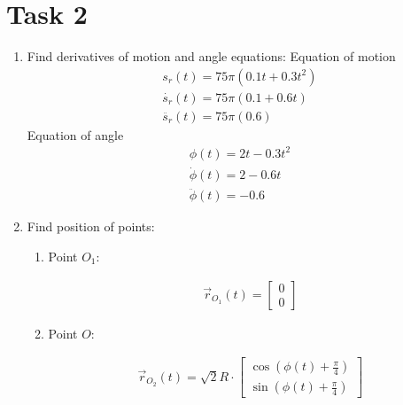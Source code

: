 \section{Task 2}

\begin{enumerate}
    \item Find derivatives of motion and angle equations:
          Equation of motion
          \begin{align}
              s_r(t) = 75 \pi (0.1 t + 0.3 t^2)   \\
              \dot{s_r}(t) = 75 \pi (0.1 + 0.6 t) \\
              \ddot{s_r}(t) = 75 \pi (0.6)
          \end{align}
          Equation of angle
          \begin{align}
              \phi(t) = 2t - 0.3t^2    \\
              \dot{\phi}(t) = 2 - 0.6t \\
              \ddot{\phi}(t) = -0.6
          \end{align}

    \item Find position of points:
          \begin{enumerate}
              \item Point $O_1$:
                    \begin{answer}
                        \begin{align}
                            \vec{r}_{O_1}(t) = \begin{bmatrix}
                                0 \\
                                0
                            \end{bmatrix}
                        \end{align}
                    \end{answer}
              \item Point $O$:
                    \begin{answer}
                        \begin{align}
                            \vec{r}_{O_2}(t) = \sqrt{2} R \cdot \begin{bmatrix}
                                \cos(\phi(t) + \frac{\pi}{4}) \\
                                \sin(\phi(t) + \frac{\pi}{4})
                            \end{bmatrix}
                        \end{align}


\end{answer}
\end{enumerate}
\end{enumerate}
